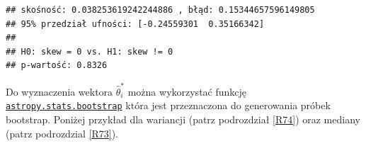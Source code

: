 \documentclass[polish,]{book}
\newenvironment{Shaded}{\begin{snugshade}}{\end{snugshade}}
\newcommand{\BuiltInTok}[1]{#1}
\newcommand{\CharTok}[1]{\textcolor[rgb]{0.31,0.60,0.02}{#1}}
\newcommand{\ControlFlowTok}[1]{\textcolor[rgb]{0.13,0.29,0.53}{\textbf{#1}}}
\newcommand{\DecValTok}[1]{\textcolor[rgb]{0.00,0.00,0.81}{#1}}
\newcommand{\FloatTok}[1]{\textcolor[rgb]{0.00,0.00,0.81}{#1}}
\newcommand{\ImportTok}[1]{#1}
\newcommand{\KeywordTok}[1]{\textcolor[rgb]{0.13,0.29,0.53}{\textbf{#1}}}
\newcommand{\NormalTok}[1]{#1}
\newcommand{\OperatorTok}[1]{\textcolor[rgb]{0.81,0.36,0.00}{\textbf{#1}}}
\newcommand{\StringTok}[1]{\textcolor[rgb]{0.31,0.60,0.02}{#1}}
\begin{document}
\begin{Shaded}
\end{Shaded}

\begin{verbatim}
## skośność: 0.038253619242244886 , błąd: 0.15344657596149805
## 95% przedział ufności: [-0.24559301  0.35166342]
## 
## H0: skew = 0 vs. H1: skew != 0
## p-wartość: 0.8326
\end{verbatim}

Do wyznaczenia wektora \(\hat{\theta}^*_i\) można wykorzystać funkcję \href{http://docs.astropy.org/en/stable/api/astropy.stats.bootstrap.html\#astropy.stats.bootstrap}{\texttt{astropy.stats.bootstrap}} która jest przeznaczona do generowania próbek bootstrap.
Poniżej przykład dla wariancji (patrz podrozdział \ref{R74}) oraz mediany (patrz podrozdzial \ref{R73}).
\end{document}
